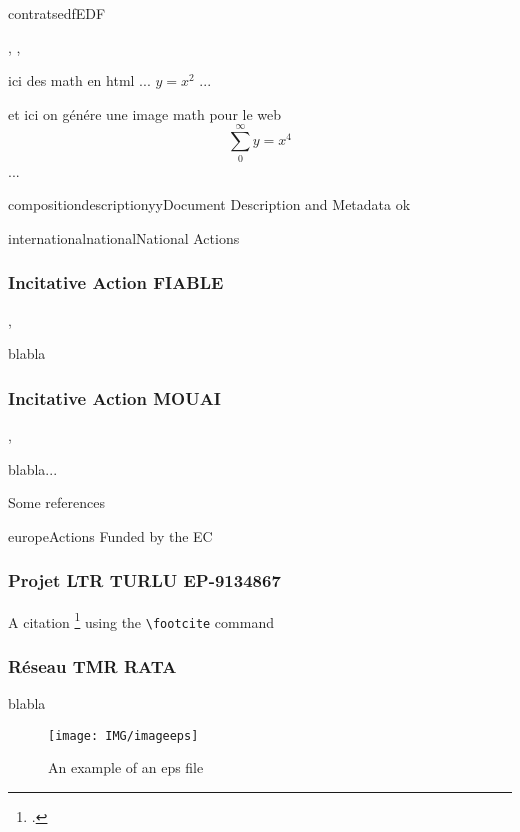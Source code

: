 \documentclass{ra2011}
\begin{document}
\begin{module}{contrats}{edf}{EDF}
\begin{participants}
, 
,
\end{participants}
ici des math en html 
... $y=x^2$ ...

et ici on génére une image math pour le web  
\begin{displaymath}
\sum_{0}^{\infty} y = x^4
\end{displaymath}
...

\end{module}

\begin{module}{composition}{descriptionyy}{Document Description and Metadata}
ok
\end{module}


\begin{module}{international}{national}{National Actions}

\subsubsection{Incitative Action  FIABLE}
\begin{participants}
,
\end{participants}

blabla

\subsubsection{Incitative Action  MOUAI}
\begin{participants}
, 
\end{participants}

blabla...

Some references 

\end{module}


\begin{module}{}{europe}{Actions Funded by the EC}
\subsubsection{Projet LTR TURLU EP-9134867}
A citation \footcite{MB07} using the \verb=\footcite= command
\subsubsection{Réseau TMR RATA}
blabla

\begin{figure}
\begin{center}
\texttt{[image: IMG/imageeps]}
\end{center}
\caption{An example of an eps file}
\label{fig:completemap}
\end{figure}


\end{module}
\end{document}
